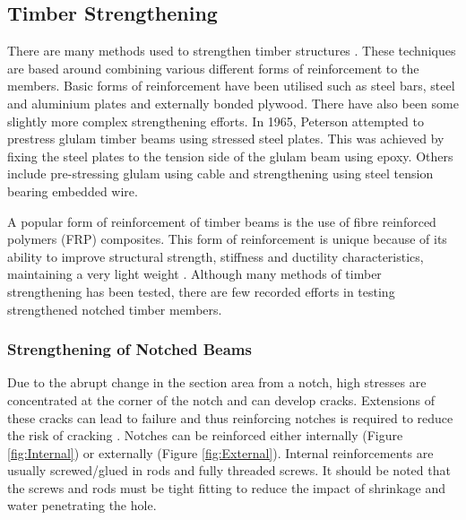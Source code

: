 \documentclass[11pt,a4paper]{article}
\numberwithin{equation}{subsection}
\begin{document}
\subsection{Timber Strengthening}
There are many methods used to strengthen timber structures \cite{plevris_frp-reinforced_1992}. These techniques are based around combining various different forms of reinforcement to the members. Basic forms of reinforcement have been utilised such as steel bars, steel and aluminium plates and externally bonded plywood. There have also been some slightly more complex strengthening efforts. In 1965, Peterson \cite{leicester_size_1969} attempted to prestress glulam timber beams using stressed steel plates. This was achieved by fixing the steel plates to the tension side of the glulam beam using epoxy. Others include pre-stressing glulam using cable and strengthening using steel tension bearing embedded wire. 

\vspace*{\baselineskip}

\noindent
A popular form of reinforcement of timber beams is the use of fibre reinforced polymers (FRP) composites. This form of reinforcement is unique because of its ability to improve structural strength, stiffness and ductility characteristics, maintaining a very light weight \cite{plevris_frp-reinforced_1992}. Although many methods of timber strengthening has been tested, there are few recorded efforts in testing strengthened notched timber members. 


\subsubsection{Strengthening of Notched Beams}
Due to the abrupt change in the section area from a notch, high stresses are concentrated at the corner of the notch and can develop cracks. Extensions of these cracks can lead to failure and thus reinforcing notches is required to reduce the risk of cracking \cite{jockwer_structural_2014}. Notches can be reinforced either internally (Figure \ref{fig:Internal}) or externally (Figure \ref{fig:External}). Internal reinforcements are usually screwed/glued in rods and fully threaded screws. It should be noted that the screws and rods must be tight fitting to reduce the impact of shrinkage and water penetrating the hole\cite{jockwer_structural_2014,fawwaz_structural_2012}. 
\end{document}
